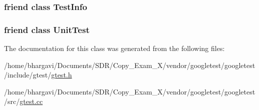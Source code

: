 \subsubsection[{\texorpdfstring{Test\+Info}{TestInfo}}]{\setlength{\rightskip}{0pt plus 5cm}friend class {\bf Test\+Info}\hspace{0.3cm}{\ttfamily [friend]}}\hypertarget{classtesting_1_1_test_result_a4c49c2cdb6c328e6b709b4542f23de3c}{}\label{classtesting_1_1_test_result_a4c49c2cdb6c328e6b709b4542f23de3c}
\subsubsection[{\texorpdfstring{Unit\+Test}{UnitTest}}]{\setlength{\rightskip}{0pt plus 5cm}friend class {\bf Unit\+Test}\hspace{0.3cm}{\ttfamily [friend]}}\hypertarget{classtesting_1_1_test_result_a832b4d233efee1a32feb0f4190b30d39}{}\label{classtesting_1_1_test_result_a832b4d233efee1a32feb0f4190b30d39}


The documentation for this class was generated from the following files\+:\begin{DoxyCompactItemize}
\item 
/home/bhargavi/\+Documents/\+S\+D\+R/\+Copy\+\_\+\+Exam\+\_\+X/vendor/googletest/googletest/include/gtest/\hyperlink{gtest_8h}{gtest.\+h}\item 
/home/bhargavi/\+Documents/\+S\+D\+R/\+Copy\+\_\+\+Exam\+\_\+X/vendor/googletest/googletest/src/\hyperlink{gtest_8cc}{gtest.\+cc}\end{DoxyCompactItemize}
